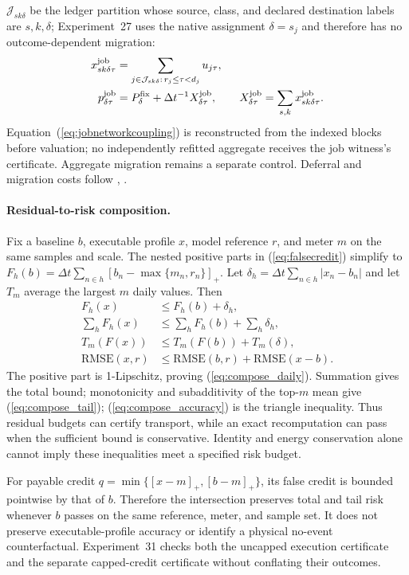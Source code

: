 \documentclass[10pt,journal]{IEEEtran}
\newcommand{\dt}{\Delta t}
\begin{document}
$\mathcal J_{sk\delta}$ be the ledger partition whose source, class, and
declared destination labels are $s,k,\delta$; Experiment~27 uses the native
assignment $\delta=s_j$ and therefore has no outcome-dependent migration:
\begin{align}
 x^{\rm job}_{sk\delta\tau}&=\sum_{j\in\mathcal J_{sk\delta}:\,r_j\leq\tau<d_j}
 u_{j\tau},\\
 p^{\rm job}_{\delta\tau}&=P_\delta^{\rm fix}+\dt^{-1}X^{\rm job}_{\delta\tau},\qquad
 X^{\rm job}_{\delta\tau}=\sum_{s,k}x^{\rm job}_{sk\delta\tau}.
 \label{eq:jobnetworkcoupling}
\end{align}
Equation~(\ref{eq:jobnetworkcoupling}) is reconstructed from the indexed
blocks before valuation; no independently refitted aggregate receives the
job witness's certificate. Aggregate migration remains a separate control.
Deferral and migration costs follow
\cite{cao2022flexibility,cao2024nonwire}, \cite{zhang2023receding}.

\paragraph{Residual-to-risk composition.}
Fix a baseline $b$, executable profile $x$, model reference $r$, and meter
$m$ on the same samples and scale. The nested positive parts in
(\ref{eq:falsecredit}) simplify to
$F_h(b)=\dt\sum_{n\in h}[b_n-\max\{m_n,r_n\}]_+$.
Let $\delta_h=\dt\sum_{n\in h}|x_n-b_n|$ and let
$T_m$ average the largest $m$ daily values. Then
\begin{align}
 F_h(x)&\leq F_h(b)+\delta_h,\label{eq:compose_daily}\\
 \sum_hF_h(x)&\leq\sum_hF_h(b)+\sum_h\delta_h,\nonumber\\
 T_m(F(x))&\leq T_m(F(b))+T_m(\delta),\label{eq:compose_tail}\\
 \mathrm{RMSE}(x,r)&\leq\mathrm{RMSE}(b,r)+\mathrm{RMSE}(x-b).
 \label{eq:compose_accuracy}
\end{align}
The positive part is 1-Lipschitz, proving (\ref{eq:compose_daily}). Summation gives
the total bound; monotonicity and subadditivity of the top-$m$ mean give
(\ref{eq:compose_tail}); (\ref{eq:compose_accuracy}) is the triangle inequality. Thus
residual budgets can certify transport, while an exact recomputation can pass
when the sufficient bound is conservative. Identity and energy conservation
alone cannot imply these inequalities meet a specified risk budget.

For payable credit $q=\min\{[x-m]_+,[b-m]_+\}$, its false credit is bounded
pointwise by that of $b$. Therefore the intersection preserves total and tail
risk whenever $b$ passes on the same reference, meter, and sample set. It does
not preserve executable-profile accuracy or identify a physical no-event
counterfactual. Experiment~31 checks both the uncapped execution certificate
and the separate capped-credit certificate without conflating their outcomes.
\end{document}
